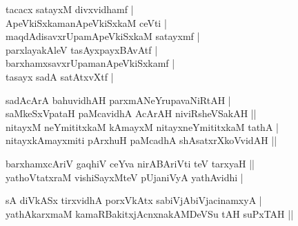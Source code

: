 \begin{entry}
\medskip
\begin{shl}
tacacx satayxM divxvidhamf |\\[2pt]
ApeVkiSxkamanApeVkiSxkaM ceVti |\\[2pt]
maqdAdisavxrUpamApeVkiSxkaM satayxmf |\\[2pt]
parxlayakAleV tasAyxpayxBAvAtf |\\[2pt]
barxhamxsavxrUpamanApeVkiSxkamf |\\[2pt]
tasayx sadA satAtxvXtf |\\[-1pt]
\end{shl}
\smallskip
{}
\medskip
{}
\medskip
\begin{shl}
sadAcArA bahuvidhAH parxmANeYrupavaNiRtAH |\\[2pt]
saMkeSxVpataH paMcavidhA AcArAH niviRsheVSakAH ||\\[2pt]
nitayxM neYmititxkaM kAmayxM nitayxneYmititxkaM tathA |\\[2pt]
nitayxkAmayxmiti pArxhuH paMcadhA shAsatxrXkoVvidAH ||\\[-1pt]
\end{shl}
\medskip
{}
\medskip
{}
\medskip
\begin{shl}
barxhamxcAriV gaqhiV ceYva nirABAriVti teV tarxyaH ||\\[2pt]
yathoVtatxraM vishiSayxMteV pUjaniVyA yathAvidhi |\\[-1pt]
\end{shl}
\medskip
{}
\medskip
{}
\medskip
\begin{shl}
sA diVkASx tirxvidhA porxVkAtx sabiVjAbiVjacinamxyA |\\[2pt]
yathAkarxmaM kamaRBakitxjAcnxnakAMDeVSu tAH suPxTAH ||\\[-1pt]
\end{shl}

\end{entry}
